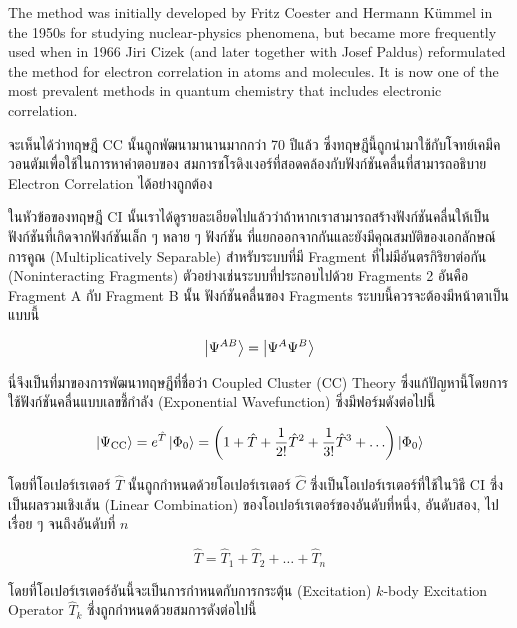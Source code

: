 \begin{displayquote}
    The method was initially developed by Fritz Coester and Hermann Kümmel in the 1950s for studying
    nuclear-physics phenomena, but became more frequently used when in 1966 Jiri Cizek (and later together
    with Josef Paldus) reformulated the method for electron correlation in atoms and molecules.
    It is now one of the most prevalent methods in quantum chemistry that includes electronic correlation.
\end{displayquote}

\noindent จะเห็นได้ว่าทฤษฎี CC นั้นถูกพัฒนามานานมากกว่า 70 ปีแล้ว ซึ่งทฤษฎีนี้ถูกนำมาใช้กับโจทย์เคมีควอนตัมเพื่อใช้ในการหาคำตอบของ%
สมการชโรดิงเงอร์ที่สอดคล้องกับฟังก์ชันคลื่นที่สามารถอธิบาย Electron Correlation ได้อย่างถูกต้อง

ในหัวข้อของทฤษฎี CI นั้นเราได้ดูรายละเอียดไปแล้วว่าถ้าหากเราสามารถสร้างฟังก์ชันคลื่นให้เป็นฟังก์ชันที่เกิดจากฟังก์ชันเล็ก ๆ หลาย ๆ ฟังก์ชัน%
ที่แยกออกจากกันและยังมีคุณสมบัติของเอกลักษณ์การคูณ (Multiplicatively Separable) สำหรับระบบที่มี Fragment ที่ไม่มีอันตรกิริยาต่อกัน
(Noninteracting Fragments) ตัวอย่างเช่นระบบที่ประกอบไปด้วย Fragments 2 อันคือ Fragment A กับ Fragment B นั้น ฟังก์ชันคลื่นของ
Fragments ระบบนี้ควรจะต้องมีหน้าตาเป็นแบบนี้

\begin{equation}
    \ket{\Psi^{AB}} = \ket{\Psi^A\Psi^B}
\end{equation}

นี่จึงเป็นที่มาของการพัฒนาทฤษฎีที่ชื่อว่า Coupled Cluster (CC) Theory ซึ่งแก้ปัญหานี้โดยการใช้ฟังก์ชันคลื่นแบบเลขชี้กำลัง (Exponential
Wavefunction) ซึ่งมีฟอร์มดังต่อไปนี้

\begin{equation}
    \ket{\Psi_{\mathrm{CC}}}
    = e^{\hat{T}} \ket{\Phi_0}
    = \left(1 + \hat{T} + \frac{1}{2!}\hat{T}^2 + \frac{1}{3!}\hat{T}^3 + \ldots \right)\ket{\Phi_0}
\end{equation}

\noindent โดยที่โอเปอร์เรเตอร์ $\hat{T}$ นั้นถูกกำหนดด้วยโอเปอร์เรเตอร์ $\hat{C}$ ซึ่งเป็นโอเปอร์เรเตอร์ที่ใช้ในวิธี CI ซึ่งเป็นผลรวมเชิงเส้น
(Linear Combination) ของโอเปอร์เรเตอร์ของอันดับที่หนึ่ง, อันดับสอง, ไปเรื่อย ๆ จนถึงอันดับที่ $n$

\begin{equation}
    \hat{T} = \hat{T}_1 + \hat{T}_2 + \ldots + \hat{T}_n
\end{equation}

\noindent โดยที่โอเปอร์เรเตอร์อันนี้จะเป็นการกำหนดกับการกระตุ้น (Excitation) $k$-body Excitation Operator $\hat{T}_k$
ซึ่งถูกกำหนดด้วยสมการดังต่อไปนี้

